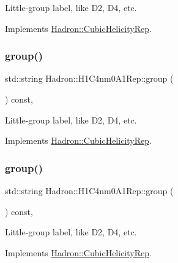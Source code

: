 Little-\/group label, like D2, D4, etc. 

Implements \mbox{\hyperlink{structHadron_1_1CubicHelicityRep_a101a7d76cd8ccdad0f272db44b766113}{Hadron\+::\+Cubic\+Helicity\+Rep}}.

\mbox{\label{structHadron_1_1H1C4nm0A1Rep_a5f7db1ef15b67eaee1c5fc81ed9ec2bd}} 
\subsubsection{\texorpdfstring{group()}{group()}\hspace{0.1cm}{\footnotesize\ttfamily [3/5]}}
{\footnotesize\ttfamily std\+::string Hadron\+::\+H1\+C4nm0\+A1\+Rep\+::group (\begin{DoxyParamCaption}{ }\end{DoxyParamCaption}) const\hspace{0.3cm}{\ttfamily [inline]}, {\ttfamily [virtual]}}

Little-\/group label, like D2, D4, etc. 

Implements \mbox{\hyperlink{structHadron_1_1CubicHelicityRep_a101a7d76cd8ccdad0f272db44b766113}{Hadron\+::\+Cubic\+Helicity\+Rep}}.

\mbox{\label{structHadron_1_1H1C4nm0A1Rep_a5f7db1ef15b67eaee1c5fc81ed9ec2bd}} 
\subsubsection{\texorpdfstring{group()}{group()}\hspace{0.1cm}{\footnotesize\ttfamily [4/5]}}
{\footnotesize\ttfamily std\+::string Hadron\+::\+H1\+C4nm0\+A1\+Rep\+::group (\begin{DoxyParamCaption}{ }\end{DoxyParamCaption}) const\hspace{0.3cm}{\ttfamily [inline]}, {\ttfamily [virtual]}}

Little-\/group label, like D2, D4, etc. 

Implements \mbox{\hyperlink{structHadron_1_1CubicHelicityRep_a101a7d76cd8ccdad0f272db44b766113}{Hadron\+::\+Cubic\+Helicity\+Rep}}.

